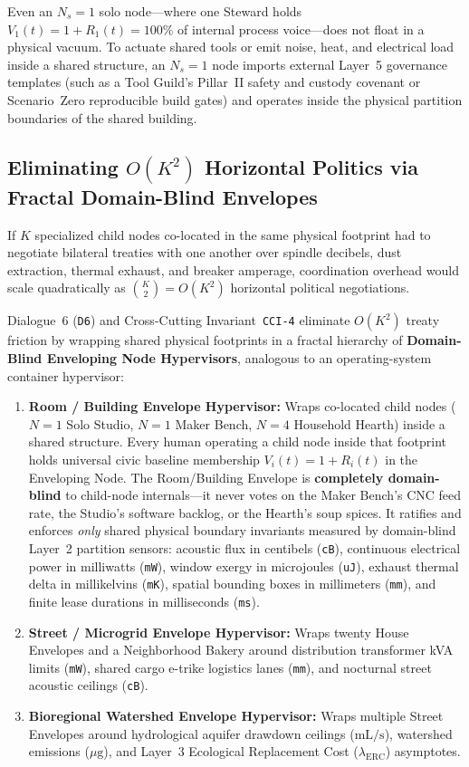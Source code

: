 Even an $N_s = 1$ solo node---where one Steward holds $V_1(t) = 1 + R_1(t) = 100\%$ of
internal process voice---does not float in a physical vacuum. To actuate shared tools or emit
noise, heat, and electrical load inside a shared structure, an $N_s = 1$ node imports
external Layer~5 governance templates (such as a Tool Guild's Pillar~II safety and custody
covenant or Scenario~Zero reproducible build gates) and operates inside the physical
partition boundaries of the shared building.

\subsection{Eliminating $O(K^2)$ Horizontal Politics via Fractal Domain-Blind Envelopes}

If $K$ specialized child nodes co-located in the same physical footprint had to negotiate
bilateral treaties with one another over spindle decibels, dust extraction, thermal exhaust,
and breaker amperage, coordination overhead would scale quadratically as $\binom{K}{2} = O(K^2)$
horizontal political negotiations.

Dialogue~6 (\texttt{D6}) and Cross-Cutting Invariant~\texttt{CCI-4} eliminate $O(K^2)$
treaty friction by wrapping shared physical footprints in a fractal hierarchy of
\textbf{Domain-Blind Enveloping Node Hypervisors}, analogous to an operating-system container
hypervisor:
\begin{enumerate}
\item \textbf{Room / Building Envelope Hypervisor:} Wraps co-located child nodes ($N=1$ Solo
        Studio, $N=1$ Maker Bench, $N=4$ Household Hearth) inside a shared structure. Every
        human operating a child node inside that footprint holds universal civic baseline
        membership $V_i(t) = 1 + R_i(t)$ in the Enveloping Node. The Room/Building Envelope
        is \textbf{completely domain-blind} to child-node internals---it never votes on the
        Maker Bench's CNC feed rate, the Studio's software backlog, or the Hearth's soup
        spices. It ratifies and enforces \textit{only} shared physical boundary invariants
        measured by domain-blind Layer~2 partition sensors: acoustic flux in centibels
        (\texttt{cB}), continuous electrical power in milliwatts (\texttt{mW}), window exergy
        in microjoules (\texttt{uJ}), exhaust thermal delta in millikelvins (\texttt{mK}),
        spatial bounding boxes in millimeters (\texttt{mm}), and finite lease durations in
        milliseconds (\texttt{ms}).
\item \textbf{Street / Microgrid Envelope Hypervisor:} Wraps twenty House Envelopes and a
        Neighborhood Bakery around distribution transformer kVA limits (\texttt{mW}), shared
        cargo e-trike logistics lanes (\texttt{mm}), and nocturnal street acoustic ceilings
        (\texttt{cB}).
\item \textbf{Bioregional Watershed Envelope Hypervisor:} Wraps multiple Street Envelopes
        around hydrological aquifer drawdown ceilings ($\mathrm{mL/s}$), watershed emissions
        ($\mu\mathrm{g}$), and Layer~3 Ecological Replacement Cost ($\lambda_{\mathrm{ERC}}$)
        asymptotes.
\end{enumerate}

